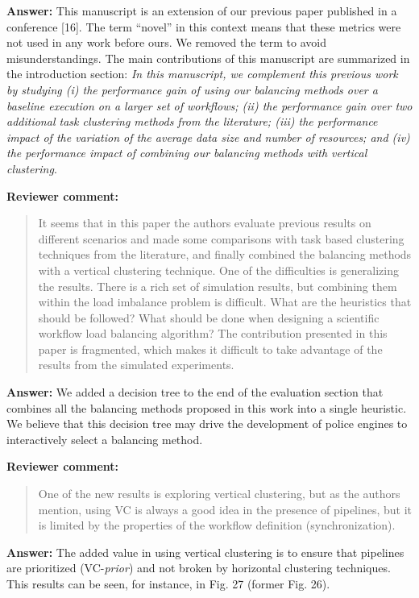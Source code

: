 \documentclass{letter}
\newenvironment{review}%
{\textbf{Reviewer comment:}\begin{quote}}%
{\end{quote}}%
\newcommand{\answer}[1]{%
      \textbf{Answer:} #1}
\newcommand{\revised}[1]{\emph{#1}\color{black}}
\begin{document}
\begin{letter}{}
\answer{This manuscript is an extension of our previous paper published in a conference [16]. The term ``novel'' in this context means that these metrics were not used in any work before ours. We removed the term to avoid misunderstandings. The main contributions of this manuscript are summarized in the introduction section: \revised{In this manuscript, we complement this previous work by studying (i) the performance gain of using our balancing methods over a baseline execution on a larger set of workflows; (ii) the performance gain over two additional task clustering methods from the literature; (iii) the performance impact of the variation of the average data size and number of resources; and (iv) the performance impact of combining our balancing methods with vertical clustering}.}


\begin{review}
It seems that in this paper the authors evaluate previous results on different scenarios and made some comparisons with task based clustering techniques from the literature, and finally combined the balancing methods with a vertical clustering technique. One of the difficulties is generalizing the results. There is a rich set of simulation results, but combining them within the load imbalance problem is difficult. What are the heuristics that should be followed? What should be done when designing a scientific workflow load balancing algorithm? The contribution presented in this paper is fragmented, which makes it difficult to take advantage of the results from the simulated experiments. 
\end{review}

\answer{We added a decision tree to the end of the evaluation section that combines all the balancing methods proposed in this work into a single heuristic. We believe that this decision tree may drive the development of police engines to interactively select a balancing method.}


\begin{review}
One of the new results is exploring vertical clustering, but as the authors mention, using VC is always a good idea in the presence of pipelines, but it is limited by the properties of the workflow definition (synchronization). 
\end{review}

\answer{The added value in using vertical clustering is to ensure that pipelines are prioritized (VC-\emph{prior}) and not broken by horizontal clustering techniques. This results can be seen, for instance, in Fig. 27 (former Fig. 26).}



\end{letter}
\end{document}
